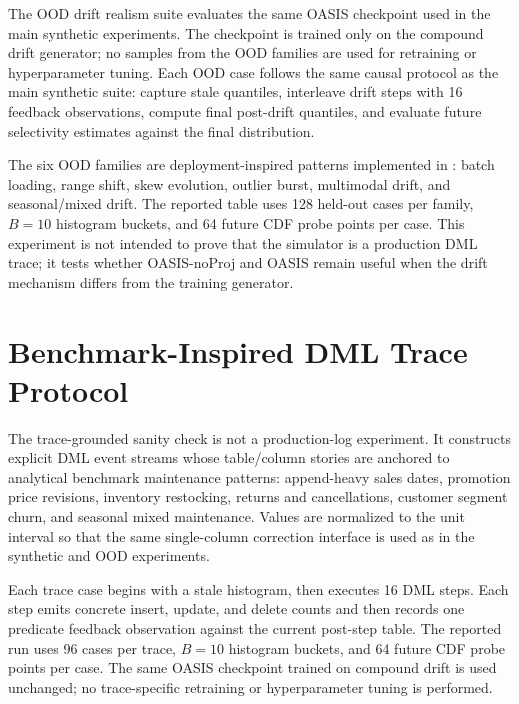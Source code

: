 \documentclass[11pt]{article}
\begin{document}
The OOD drift realism suite evaluates the same OASIS checkpoint used in the
main synthetic experiments. The checkpoint is trained only on the compound drift
generator; no samples from the OOD families are used for retraining or
hyperparameter tuning. Each OOD case follows the same causal protocol as the
main synthetic suite: capture stale quantiles, interleave drift steps with 16
feedback observations, compute final post-drift quantiles, and evaluate future
selectivity estimates against the final distribution.

The six OOD families are deployment-inspired patterns implemented in
: batch loading, range shift, skew
evolution, outlier burst, multimodal drift, and seasonal/mixed drift. The
reported table uses 128 held-out cases per family, $B=10$ histogram buckets,
and 64 future CDF probe points per case. This experiment is not intended to
prove that the simulator is a production DML trace; it tests whether OASIS-noProj
and OASIS remain useful when the drift mechanism differs from the training
generator.

\section{Benchmark-Inspired DML Trace Protocol}
\label{sec:trace-drift-app}

The trace-grounded sanity check is not a production-log experiment. It
constructs explicit DML event streams whose table/column stories are anchored
to analytical benchmark maintenance patterns: append-heavy sales dates,
promotion price revisions, inventory restocking, returns and cancellations,
customer segment churn, and seasonal mixed maintenance. Values are normalized
to the unit interval so that the same single-column correction interface is
used as in the synthetic and OOD experiments.

Each trace case begins with a stale histogram, then executes 16 DML steps. Each
step emits concrete insert, update, and delete counts and then records one
predicate feedback observation against the current post-step table. The
reported run uses 96 cases per trace, $B=10$ histogram buckets, and 64 future
CDF probe points per case. The same OASIS checkpoint trained on compound drift
is used unchanged; no trace-specific retraining or hyperparameter tuning is
performed.
\end{document}
